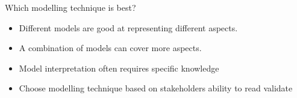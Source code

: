 
\begin{Slide}{Which modelling technique is best? }

\begin{itemize}
\item Different models are good at representing different aspects.

\item A combination of models can cover more aspects.

\item Model interpretation often requires specific knowledge

\item Choose modelling technique based on stakeholders ability to read validate

\end{itemize}
\end{Slide}